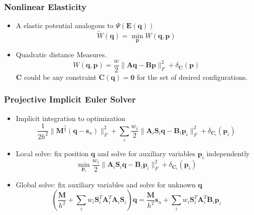 \documentclass[serif,mathserif]{beamer}
\begin{document}
\begin{frame}
  \frametitle{Nonlinear Elasticity}
  \begin{itemize}
   \item A elastic potential analogous to $\Psi(\mathbf{E}(\mathbf{q}))$
    \begin{equation*}
      \widetilde{W}(\mathbf{q})=\min_{\mathbf{p}}W(\mathbf{q}, \mathbf{p})
    \end{equation*}
    \item Quadratic distance Measures.
      \begin{equation*}
	W(\mathbf{q}, \mathbf{p})=\frac{w}{2}\|\mathbf{Aq}-\mathbf{Bp}\|^2_F+\delta_{\mathbf{C}}(\mathbf{p})
      \end{equation*}
      $\mathbf{C}$ could be any constraint $\mathbf{C}(\mathbf{q})=\mathbf{0}$ for the set of desired configurations. 
  \end{itemize}
\end{frame}

\begin{frame}
 \frametitle{Projective Implicit Euler Solver}
 \begin{itemize}
  \item Implicit integration to optimization
    \begin{equation*}
      \frac{1}{2h^2}\|\mathbf{M}^{\frac{1}{2}}(\mathbf{q}-\mathbf{s}_n)\|^2_F+\sum_i \frac{w_i}{2}\|\mathbf{A}_i
      \mathbf{S}_i\mathbf{q}-\mathbf{B}_i\mathbf{p}_i\|^2_F+\delta_{\mathbf{C}_i}(\mathbf{p}_i)
    \end{equation*}
  \item Local solve: fix position $\mathbf{q}$ and solve for auxiliary variables $\mathbf{p}_i$ independently
    \begin{equation*}
     \min_{\mathbf{p}_i} \frac{w_i}{2}\|\mathbf{A}_i
      \mathbf{S}_i\mathbf{q}-\mathbf{B}_i\mathbf{p}_i\|^2_F+\delta_{\mathbf{C}_i}(\mathbf{p}_i)
    \end{equation*}
  \item Global solve: fix auxiliary variables and solve for unknown $\mathbf{q}$
    \begin{equation*}
     (\frac{\mathbf{M}}{h^2}+\sum_i w_i\mathbf{S}_i^T\mathbf{A}_i^T\mathbf{A}_i\mathbf{S}_i)\mathbf{q}=\frac{\mathbf{M}}{h^2}
     \mathbf{s}_n + \sum_i w_i\mathbf{S}_i^T\mathbf{A}_i^T\mathbf{B}_i\mathbf{p}_i
    \end{equation*}
 \end{itemize}
\end{frame}
\end{document}
